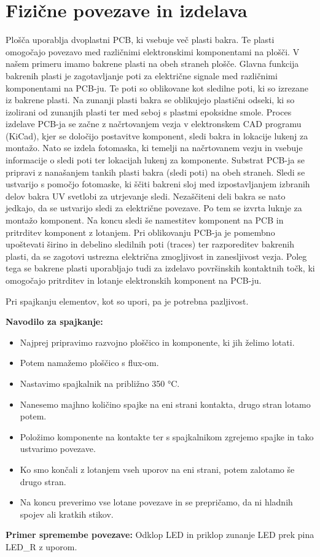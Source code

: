 \section{Fizične povezave in izdelava}
Plošča uporablja dvoplastni PCB, ki vsebuje več plasti bakra. Te plasti omogočajo povezavo med različnimi elektronskimi komponentami na plošči. V našem primeru imamo bakrene plasti na obeh straneh plošče. Glavna funkcija bakrenih plasti je zagotavljanje poti za električne signale med različnimi komponentami na PCB-ju. Te poti so oblikovane kot sledilne poti, ki so izrezane iz bakrene plasti. Na zunanji plasti bakra se oblikujejo plastični odseki, ki so izolirani od zunanjih plasti ter med seboj s plastmi epoksidne smole. Proces izdelave PCB-ja se začne z načrtovanjem vezja v elektronskem CAD programu (KiCad), kjer se določijo postavitve komponent, sledi bakra in lokacije lukenj za montažo. Nato se izdela fotomaska, ki temelji na načrtovanem vezju in vsebuje informacije o sledi poti ter lokacijah lukenj za komponente. Substrat PCB-ja se pripravi z nanašanjem tankih plasti bakra (sledi poti) na obeh straneh. Sledi se ustvarijo s pomočjo fotomaske, ki ščiti bakreni sloj med izpostavljanjem izbranih delov bakra UV svetlobi za utrjevanje sledi. Nezaščiteni deli bakra se nato jedkajo, da se ustvarijo sledi za električne povezave. Po tem se izvrta luknje za montažo komponent. Na koncu sledi še namestitev komponent na PCB in pritrditev komponent z lotanjem. Pri oblikovanju PCB-ja je pomembno upoštevati širino in debelino sledilnih poti (traces) ter razporeditev bakrenih plasti, da se zagotovi ustrezna električna zmogljivost in zanesljivost vezja. Poleg tega se bakrene plasti uporabljajo tudi za izdelavo površinskih kontaktnih točk, ki omogočajo pritrditev in lotanje elektronskih komponent na PCB-ju.

Pri spajkanju elementov, kot so upori, pa je potrebna pazljivost.

\textbf{Navodilo za spajkanje:}
\begin{itemize}
    \item Najprej pripravimo razvojno ploščico in komponente, ki jih želimo lotati. 
    \item Potem namažemo ploščico s flux-om. 
    \item Nastavimo spajkalnik na približno 350 °C. 
    \item Nanesemo majhno količino spajke na eni strani kontakta, drugo stran lotamo potem. 
    \item Položimo komponente na kontakte ter s spajkalnikom zgrejemo spajke in tako ustvarimo povezave. 
    \item Ko smo končali z lotanjem vseh uporov na eni strani, potem zalotamo še drugo stran. 
    \item Na koncu preverimo vse lotane povezave in se prepričamo, da ni hladnih spojev ali kratkih stikov.
\end{itemize}

\textbf{Primer spremembe povezave:} Odklop LED in priklop zunanje LED prek pina LED\_R z uporom.